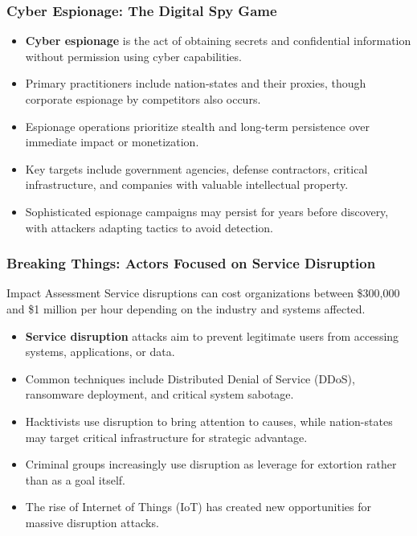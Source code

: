 \documentclass{beamer}
\begin{document}
\begin{frame}
    \frametitle{Cyber Espionage: The Digital Spy Game}
    
    \begin{itemize}
        \item \textbf{Cyber espionage} is the act of obtaining secrets and confidential information without permission using cyber capabilities.
        \item Primary practitioners include nation-states and their proxies, though corporate espionage by competitors also occurs.
        \item Espionage operations prioritize stealth and long-term persistence over immediate impact or monetization.
        \item Key targets include government agencies, defense contractors, critical infrastructure, and companies with valuable intellectual property.
        \item Sophisticated espionage campaigns may persist for years before discovery, with attackers adapting tactics to avoid detection.
    \end{itemize}
\end{frame}

\begin{frame}
    \frametitle{Breaking Things: Actors Focused on Service Disruption}
    
    \begin{block}{Impact Assessment}
        Service disruptions can cost organizations between \$300,000 and \$1 million per hour depending on the industry and systems affected.
    \end{block}
    
    \begin{itemize}
        \item \textbf{Service disruption} attacks aim to prevent legitimate users from accessing systems, applications, or data.
        \item Common techniques include Distributed Denial of Service (DDoS), ransomware deployment, and critical system sabotage.
        \item Hacktivists use disruption to bring attention to causes, while nation-states may target critical infrastructure for strategic advantage.
        \item Criminal groups increasingly use disruption as leverage for extortion rather than as a goal itself.
        \item The rise of Internet of Things (IoT) has created new opportunities for massive disruption attacks.
    \end{itemize}
\end{frame}
\end{document}

